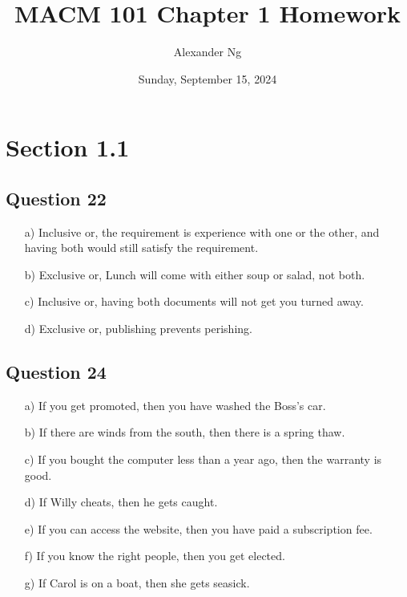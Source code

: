 \documentclass[12pt]{article}
\begin{document}
\title{MACM 101 Chapter 1 Homework}
\author{Alexander Ng}
\date{Sunday, September 15, 2024}

\maketitle

\section{Section 1.1}

\subsection*{Question 22}
\begin{itemize}
    \item[a)] Inclusive or, the requirement is experience with one or the other,
      and having both would still satisfy the requirement.
    \item[b)] Exclusive or, Lunch will come with either soup or salad, not both.
    \item[c)] Inclusive or, having both documents will not get you turned away.
    \item[d)] Exclusive or, publishing prevents perishing.
\end{itemize}

\subsection*{Question 24}
\begin{itemize}
    \item[a)] If you get promoted, then you have washed the Boss's car.
    \item[b)] If there are winds from the south, then there is a spring thaw.
    \item[c)] If you bought the computer less than a year ago, then the warranty
      is good.
    \item[d)] If Willy cheats, then he gets caught.
    \item[e)] If you can access the website, then you have paid a subscription
      fee.
    \item[f)] If you know the right people, then you get elected.
    \item[g)] If Carol is on a boat, then she gets seasick.
\end{itemize}
\end{document}
